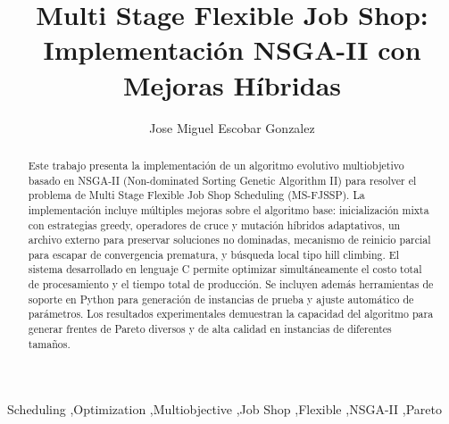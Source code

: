 \documentclass[preprint,12pt,authoryear]{elsarticle}
\begin{document}
\begin{frontmatter}



\title{Multi Stage Flexible Job Shop: Implementación NSGA-II con Mejoras Híbridas} %


\author{Jose Miguel Escobar Gonzalez} %



\begin{abstract}
Este trabajo presenta la implementación de un algoritmo evolutivo multiobjetivo basado en NSGA-II (Non-dominated Sorting Genetic Algorithm II) para resolver el problema de Multi Stage Flexible Job Shop Scheduling (MS-FJSSP). La implementación incluye múltiples mejoras sobre el algoritmo base: inicialización mixta con estrategias greedy, operadores de cruce y mutación híbridos adaptativos, un archivo externo para preservar soluciones no dominadas, mecanismo de reinicio parcial para escapar de convergencia prematura, y búsqueda local tipo hill climbing. El sistema desarrollado en lenguaje C permite optimizar simultáneamente el costo total de procesamiento y el tiempo total de producción. Se incluyen además herramientas de soporte en Python para generación de instancias de prueba y ajuste automático de parámetros. Los resultados experimentales demuestran la capacidad del algoritmo para generar frentes de Pareto diversos y de alta calidad en instancias de diferentes tamaños.
\end{abstract}

\begin{keyword}
Scheduling \sep Optimization \sep Multiobjective \sep Job Shop \sep Flexible \sep NSGA-II \sep Pareto



\end{keyword}

\end{frontmatter}
\end{document}
